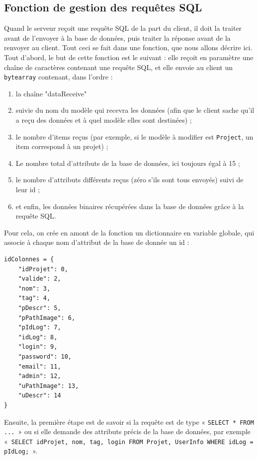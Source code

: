 \documentclass[twoside]{report}
\begin{document}
\subsection{Fonction de gestion des requêtes SQL}
Quand le serveur reçoit une requête SQL de la part du client, il doit la traiter avant de l'envoyer à la base de données, puis traiter la réponse avant de la renvoyer au client. Tout ceci se fait dans une fonction, que nous allons décrire ici. \\
Tout d'abord, le but de cette fonction est le suivant : elle reçoit en paramètre une chaîne de caractères contenant une requête SQL, et elle envoie au client un \verb!bytearray! contenant, dans l'ordre :
\begin{enumerate}
    \item la chaîne "dataReceive"
    \item suivie du nom du modèle qui recevra les données (afin que le client sache qu'il a reçu des données et à quel modèle elles sont destinées) ;
    \item le nombre d'items reçus (par exemple, si le modèle à modifier est \verb!Project!, un item correspond à un projet) ;
    \item Le nombre total d'attributs de la base de données, ici toujours égal à 15 ;
    \item le nombre d'attributs différents reçus (zéro s'ils sont tous envoyés) suivi de leur id ;
    \item et enfin, les données binaires récupérées dans la base de données grâce à la requête SQL.
\end{enumerate}
Pour cela, on crée en amont de la fonction un dictionnaire en variable globale, qui associe à chaque nom d'attribut de la base de donnée un id :
\begin{lstlisting}[style=py, caption=serveur.py : dictionnaire idColonne, label=idc]
idColonnes = {
    "idProjet": 0,
    "valide": 2,
    "nom": 3,
    "tag": 4,
    "pDescr": 5,
    "pPathImage": 6,
    "pIdLog": 7,
    "idLog": 8,
    "login": 9,
    "password": 10,
    "email": 11,
    "admin": 12,
    "uPathImage": 13,
    "uDescr": 14
}
\end{lstlisting}

Ensuite, la première étape est de savoir si la requête est de type « \verb!SELECT * FROM ...!~» ou si elle demande des attributs précis de la base de données, par exemple «~\verb!SELECT idProjet, nom, tag, login FROM Projet, UserInfo WHERE idLog = pIdLog;!~». \\
\end{document}
